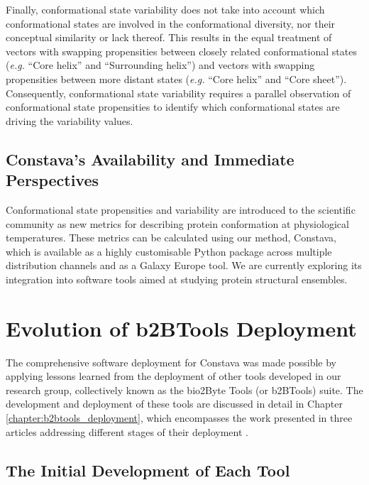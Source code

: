 Finally, conformational state variability does not take into account which conformational states are involved in the conformational diversity, nor their conceptual similarity or lack thereof. This results in the equal treatment of vectors with swapping propensities between closely related conformational states (\textit{e.g.} ``Core helix'' and ``Surrounding helix'') and vectors with swapping propensities between more distant states (\textit{e.g.} ``Core helix'' and ``Core sheet''). Consequently, conformational state variability requires a parallel observation of conformational state propensities to identify which conformational states are driving the variability values.




\subsection{Constava's Availability and Immediate Perspectives}

Conformational state propensities and variability are introduced to the scientific community as new metrics for describing protein conformation at physiological temperatures. These metrics can be calculated using our method, Constava, which is available as a highly customisable Python package across multiple distribution channels and as a Galaxy Europe tool. We are currently exploring its integration into software tools aimed at studying protein structural ensembles.


\section{Evolution of b2BTools Deployment}

The comprehensive software deployment for Constava was made possible by applying lessons learned from the deployment of other tools developed in our research group, collectively known as the bio2Byte Tools (or b2BTools) suite. The development and deployment of these tools are discussed in detail in Chapter \ref{chapter:b2btools_deployment}, which encompasses the work presented in three articles addressing different stages of their deployment \cite{kagami_online_2021, kagami_b2btools_2021, gavalda-garcia_bio2byte_2024}. 


\subsection{The Initial Development of Each Tool}

